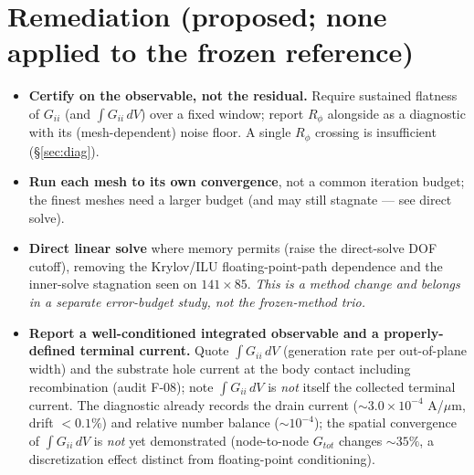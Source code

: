 \documentclass[11pt]{article}
\newcommand{\ten}[1]{\times 10^{#1}}
\begin{document}
\section{Remediation (proposed; none applied to the frozen reference)}
\begin{itemize}[nosep]
\item \textbf{Certify on the observable, not the residual.} Require sustained flatness of $G_{ii}$ (and $\int G_{ii}\,dV$) over a fixed window; report $R_\phi$ alongside as a diagnostic with its (mesh-dependent) noise floor. A single $R_\phi$ crossing is insufficient (\S\ref{sec:diag}).
\item \textbf{Run each mesh to its own convergence}, not a common iteration budget; the finest meshes need a larger budget (and may still stagnate --- see direct solve).
\item \textbf{Direct linear solve} where memory permits (raise the direct-solve DOF cutoff), removing the Krylov/ILU floating-point-path dependence and the inner-solve stagnation seen on $141\times85$. \emph{This is a method change and belongs in a separate error-budget study, not the frozen-method trio.}
\item \textbf{Report a well-conditioned integrated observable and a properly-defined terminal current.} Quote $\int G_{ii}\,dV$ (generation rate per out-of-plane width) and the substrate hole current at the body contact including recombination (audit F-08); note $\int G_{ii}\,dV$ is \emph{not} itself the collected terminal current. The diagnostic already records the drain current ($\sim\!3.0\ten{-4}$ A/$\mu$m, drift $<\!0.1\%$) and relative number balance ($\sim\!10^{-4}$); the spatial convergence of $\int G_{ii}\,dV$ is \emph{not} yet demonstrated (node-to-node $G_{tot}$ changes $\sim\!35\%$, a discretization effect distinct from floating-point conditioning).
\end{itemize}
\end{document}
